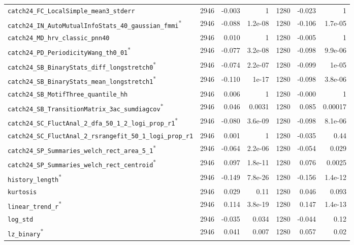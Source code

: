 \begin{longtable}{p{}rrrrrr}
\raggedright \nolinkurl{catch24_FC_LocalSimple_mean3_stderr} & 2946 & -0.003 & 1 & 1280 & -0.023 & 1 \\
\raggedright \nolinkurl{catch24_IN_AutoMutualInfoStats_40_gaussian_fmmi}\textsuperscript{*} & 2946 & -0.088 & 1.2e-08 & 1280 & -0.106 & 1.7e-05 \\
\raggedright \nolinkurl{catch24_MD_hrv_classic_pnn40} & 2946 & 0.010 & 1 & 1280 & -0.005 & 1 \\
\raggedright \nolinkurl{catch24_PD_PeriodicityWang_th0_01}\textsuperscript{*} & 2946 & -0.077 & 3.2e-08 & 1280 & -0.098 & 9.9e-06 \\
\raggedright \nolinkurl{catch24_SB_BinaryStats_diff_longstretch0}\textsuperscript{*} & 2946 & -0.074 & 2.2e-07 & 1280 & -0.099 & 1e-05 \\
\raggedright \nolinkurl{catch24_SB_BinaryStats_mean_longstretch1}\textsuperscript{*} & 2946 & -0.110 & 1e-17 & 1280 & -0.098 & 3.8e-06 \\
\raggedright \nolinkurl{catch24_SB_MotifThree_quantile_hh} & 2946 & 0.006 & 1 & 1280 & -0.000 & 1 \\
\raggedright \nolinkurl{catch24_SB_TransitionMatrix_3ac_sumdiagcov}\textsuperscript{*} & 2946 & 0.046 & 0.0031 & 1280 & 0.085 & 0.00017 \\
\raggedright \nolinkurl{catch24_SC_FluctAnal_2_dfa_50_1_2_logi_prop_r1}\textsuperscript{*} & 2946 & -0.080 & 3.6e-09 & 1280 & -0.098 & 8.1e-06 \\
\raggedright \nolinkurl{catch24_SC_FluctAnal_2_rsrangefit_50_1_logi_prop_r1} & 2946 & 0.001 & 1 & 1280 & -0.035 & 0.44 \\
\raggedright \nolinkurl{catch24_SP_Summaries_welch_rect_area_5_1}\textsuperscript{*} & 2946 & -0.064 & 2.2e-06 & 1280 & -0.054 & 0.029 \\
\raggedright \nolinkurl{catch24_SP_Summaries_welch_rect_centroid}\textsuperscript{*} & 2946 & 0.097 & 1.8e-11 & 1280 & 0.076 & 0.0025 \\
\raggedright \nolinkurl{history_length}\textsuperscript{*} & 2946 & -0.149 & 7.8e-26 & 1280 & -0.156 & 1.4e-12 \\
\raggedright \nolinkurl{kurtosis} & 2946 & 0.029 & 0.11 & 1280 & 0.046 & 0.093 \\
\raggedright \nolinkurl{linear_trend_r}\textsuperscript{*} & 2946 & 0.114 & 3.8e-19 & 1280 & 0.147 & 1.4e-13 \\
\raggedright \nolinkurl{log_std} & 2946 & -0.035 & 0.034 & 1280 & -0.044 & 0.12 \\
\raggedright \nolinkurl{lz_binary}\textsuperscript{*} & 2946 & 0.041 & 0.007 & 1280 & 0.057 & 0.02 \\

\end{longtable}

